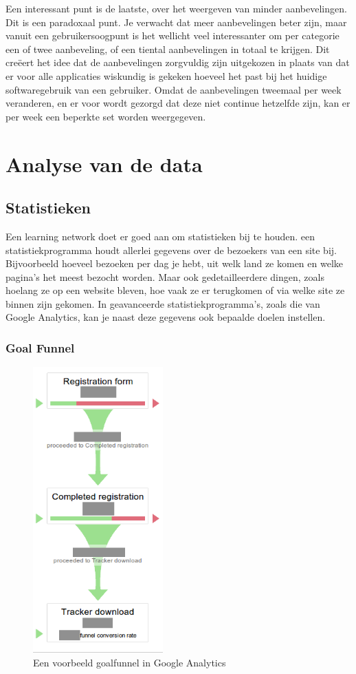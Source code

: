 \documentclass[a4paper, 10pt, pdftex]{report}
\begin{document}
      Een interessant punt is de laatste, over het weergeven van minder aanbevelingen. Dit is een paradoxaal punt. Je verwacht dat meer aanbevelingen beter zijn, maar vanuit een gebruikersoogpunt is het wellicht veel interessanter om per categorie een of twee aanbeveling, of een tiental aanbevelingen in totaal te krijgen. Dit creëert het idee dat de aanbevelingen zorgvuldig zijn uitgekozen in plaats van dat er voor alle applicaties wiskundig is gekeken hoeveel het past bij het huidige softwaregebruik van een gebruiker. Omdat de aanbevelingen tweemaal per week veranderen, en er voor wordt gezorgd dat deze niet continue hetzelfde zijn, kan er per week een beperkte set worden weergegeven.



  \newpage
  \chapter{Analyse van de data}
    \label{datachapter}
    \newpage
    \section{Statistieken}
    Een learning network doet er goed aan om statistieken bij te houden. een statistiekprogramma houdt allerlei gegevens over de bezoekers van een site bij. Bijvoorbeeld hoeveel bezoeken per dag je hebt, uit welk land ze komen en welke pagina's het meest bezocht worden. Maar ook gedetailleerdere dingen, zoals hoelang ze op een website bleven, hoe vaak ze er terugkomen of via welke site ze binnen zijn gekomen. In geavanceerde statistiekprogramma's, zoals die van Google Analytics, kan je naast deze gegevens ook bepaalde doelen instellen.

    \subsection{Goal Funnel}
      \begin{figure}
      \caption{Een voorbeeld goalfunnel in Google Analytics}
        \includegraphics[width=50mm]{../images/goalfunnel}
    \end{figure}
\end{document}
